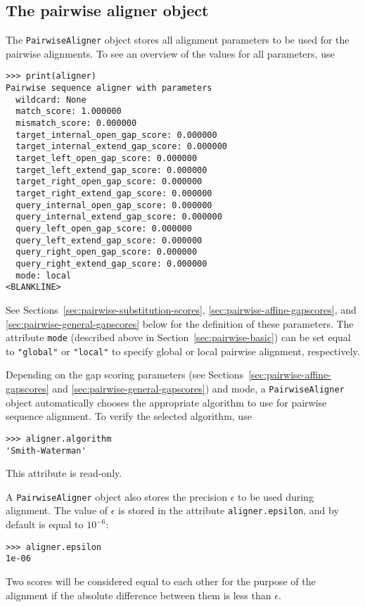 \subsection{The pairwise aligner object}
\label{sec:pairwise-aligner}

The \verb+PairwiseAligner+ object stores all alignment parameters to be used
for the pairwise alignments. To see an overview of the values for all parameters, use

\begin{verbatim}
>>> print(aligner)
Pairwise sequence aligner with parameters
  wildcard: None
  match_score: 1.000000
  mismatch_score: 0.000000
  target_internal_open_gap_score: 0.000000
  target_internal_extend_gap_score: 0.000000
  target_left_open_gap_score: 0.000000
  target_left_extend_gap_score: 0.000000
  target_right_open_gap_score: 0.000000
  target_right_extend_gap_score: 0.000000
  query_internal_open_gap_score: 0.000000
  query_internal_extend_gap_score: 0.000000
  query_left_open_gap_score: 0.000000
  query_left_extend_gap_score: 0.000000
  query_right_open_gap_score: 0.000000
  query_right_extend_gap_score: 0.000000
  mode: local
<BLANKLINE>
\end{verbatim}
See Sections~\ref{sec:pairwise-substitution-scores}, \ref{sec:pairwise-affine-gapscores}, and \ref{sec:pairwise-general-gapscores} below for the definition of these
parameters. The attribute \verb+mode+ (described above in Section~\ref{sec:pairwise-basic}) can be set equal to \verb+"global"+ or \verb+"local"+ to specify global or local pairwise alignment, respectively.

Depending on the gap scoring parameters
(see Sections~\ref{sec:pairwise-affine-gapscores} and
\ref{sec:pairwise-general-gapscores}) and mode, a \verb+PairwiseAligner+ object
automatically chooses the appropriate algorithm to use for pairwise sequence alignment. To verify the selected algorithm, use

\begin{verbatim}
>>> aligner.algorithm
'Smith-Waterman'
\end{verbatim}
This attribute is read-only.

A \verb+PairwiseAligner+ object also stores the precision $\epsilon$ to be used during alignment. The value of $\epsilon$ is stored in the attribute \verb+aligner.epsilon+, and by default is equal to $10^{-6}$:


\begin{verbatim}
>>> aligner.epsilon
1e-06
\end{verbatim}
Two scores will be considered equal to each other for the purpose of the alignment if the absolute difference between them is less than $\epsilon$.

